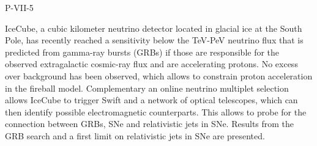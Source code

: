 P-VII-5


\bigskip



\bigskip

\noindent IceCube, a cubic kilometer neutrino detector located in glacial ice at the South Pole, has recently reached a sensitivity below the TeV-PeV neutrino flux that is predicted from gamma-ray bursts (GRBs) if those are responsible for the observed extragalactic cosmic-ray flux and are accelerating protons. No excess over background has been observed, which allows to constrain proton acceleration in the fireball model. Complementary an online neutrino multiplet selection allows IceCube to trigger Swift and a network of optical telescopes, which can then identify possible electromagnetic counterparts. This allows to probe for the connection between GRBs, SNe and relativistic jets in SNe. Results from the GRB search and a first limit on relativistic jets in SNe are presented.
